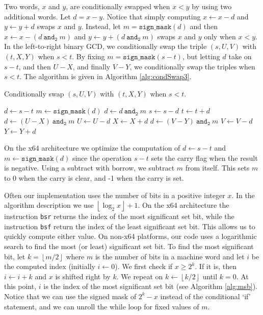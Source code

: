 \documentclass{ucalgthes1}
\theoremstyle{definition}
\newcommand{\floor}[1]{\left\lfloor #1 \right\rfloor}
\newcommand{\band}{~\texttt{and}_\texttt{2}~}
\begin{document}
Two words, $x$ and $y$, are conditionally swapped when $x < y$ by using two additional words.  Let $d = x - y$.  Notice that simply computing $x \gets x - d$ and $y \gets y + d$ swaps $x$ and $y$.  Instead, let $m = \texttt{sign\_mask}(d)$ and then  $x \gets x - (d \band m)$ and $y \gets y + (d \band m)$ swaps $x$ and $y$ only when $x < y$.  In the left-to-right binary GCD, we conditionally swap the triple $(s, U, V)$ with $(t, X, Y)$ when $s < t$.  By fixing $m = \texttt{sign\_mask}(s - t)$, but letting $d$ take on $s - t$, and then $U - X$, and finally $V - Y$, we conditionally swap the triples when $s < t$. The algorithm is given in Algorithm \ref{alg:condSwap3}.
\begin{algorithm}[htb]
\caption{Conditionally swap $(s, U, V)$ with $(t, X, Y)$ when $s < t$.}
\label{alg:condSwap3}
\begin{algorithmic}[1]
\State $d \gets s - t$
\State $m \gets \texttt{sign\_mask}(d)$
\State $d \gets d \band m$
\State $s \gets s - d$
\State $t \gets t + d$
\State $d \gets (U - X) \band m$
\State $U \gets U - d$
\State $X \gets X + d$
\State $d \gets (V - Y) \band m$
\State $V \gets V - d$
\State $Y \gets Y + d$
\end{algorithmic}
\end{algorithm}
On the x64 architecture we optimize the computation of $d \gets s - t$ and $m \gets \texttt{sign\_mask}(d)$ since the operation $s-t$ sets the carry flag when the result is negative.  Using a subtract with borrow, we subtract $m$ from itself.  This sets $m$ to 0 when the carry is clear, and -1 when the carry is set.

Often our implementation uses the number of bits in a positive integer $x$.  In the algorithm description we use $\floor{\log_2x} + 1$.  On the x64 architecture the instruction \texttt{bsr} returns the index of the most significant set bit, while the instruction \texttt{bsf} return the index of the least significant set bit.  This allows us to quickly compute either value.  On non-x64 platforms, our code uses a logarithmic search to find the most (or least) significant set bit.  To find the most significant bit, let $k = \floor{m/2}$ where $m$ is the number of bits in a machine word and let $i$ be the computed index (initially $i \gets 0$).  We first check if $x \ge 2^k$.  If it is, then $i \gets i + k$ and $x$ is shifted right by $k$.  We repeat on $k \gets \floor{k/2}$ until $k=0$.  At this point, $i$ is the index of the most significant set bit (see Algorithm \ref{alg:msb}).  Notice that we can use the signed mask of $2^k - x$ instead of the conditional `if' statement, and we can unroll the while loop for fixed values of $m$.
\end{document}
